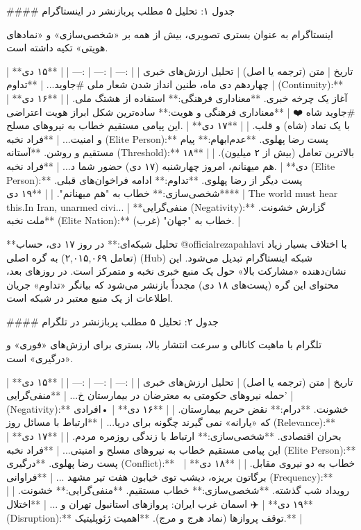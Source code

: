 \documentclass{article}
\begin{document}
#### جدول ۱: تحلیل ۵ مطلب پربازنشر در اینستاگرام

اینستاگرام به عنوان بستری تصویری، بیش از همه بر «شخصی‌سازی» و «نمادهای هویتی» تکیه داشته است.

| تاریخ | متن (ترجمه یا اصل) | تحلیل ارزش‌های خبری |
| :--- | :--- | :--- |
| **۱۵ دی** | چهاردهم دی ماه، طنین انداز شدن شعار ملی #جاوید... | **تداوم (Continuity):** آغاز یک چرخه خبری. **معناداری فرهنگی:** استفاده از هشتگ ملی. |
| **۱۶ دی** | #جاوید شاه ❤️ | **معناداری فرهنگی و هویت:** ساده‌ترین شکل ابراز هویت اعتراضی با یک نماد (شاه) و قلب. |
| **۱۷ دی** | .این پیامی مستقیم خطاب به نیروهای مسلح و امنیت... | **فراد نخبه (Elite Person):** پست رضا پهلوی. **عدم‌ابهام:** پیام مستقیم و روشن. **آستانه (Threshold):** بالاترین تعامل (بیش از ۲ میلیون). |
| **۱۸ دی** | .هم میهنانم، امروز چهارشنبه (۱۷ دی) حضور شما د... | **فراد نخبه (Elite Person):** پست دیگر از رضا پهلوی. **تداوم:** ادامه فراخوان‌های قبلی. **شخصی‌سازی:** خطاب به "هم میهنانم". |
| **۱۹ دی** | The world must hear this.In Iran, unarmed civi... | **منفی‌گرایی (Negativity):** گزارش خشونت. **ملت نخبه (Elite Nation):** خطاب به "جهان" (غرب). |

**تحلیل شبکه‌ای:** در روز ۱۷ دی، حساب @officialrezapahlavi با اختلاف بسیار زیاد (تعامل ۲,۰۱۵,۰۶۹) به گره اصلی (Hub) شبکه اینستاگرام تبدیل می‌شود. این نشان‌دهنده «مشارکت بالا» حول یک منبع خبری نخبه و متمرکز است. در روزهای بعد، محتوای این گره (پست‌های ۱۸ دی) مجدداً بازنشر می‌شود که بیانگر «تداوم» جریان اطلاعات از یک منبع معتبر در شبکه است.

#### جدول ۲: تحلیل ۵ مطلب پربازنشر در تلگرام

تلگرام با ماهیت کانالی و سرعت انتشار بالا، بستری برای ارزش‌های «فوری» و «درگیری» است.

| تاریخ | متن (ترجمه یا اصل) | تحلیل ارزش‌های خبری |
| :--- | :--- | :--- |
| **۱۵ دی** | 'حمله نیروهای حکومتی به معترضان در بیمارستان خ... | **منفی‌گرایی (Negativity):** خشونت. **درام:** نقض حریم بیمارستان. |
| **۱۶ دی** | •️افرادی که «یارانه» نمی گیرند چگونه برای دریا... | **ارتباط با مسائل روز (Relevance):** بحران اقتصادی. **شخصی‌سازی:** ارتباط با زندگی روزمره مردم. |
| **۱۷ دی** | این پیامی مستقیم خطاب به نیروهای مسلح و امنیتی... | **فراد نخبه (Elite Person):** پست رضا پهلوی. **درگیری (Conflict):** خطاب به دو نیروی مقابل. |
| **۱۸ دی** | 🔴 برگاتون بریزه، دیشب توی خیابون هفت تیر مشهد ... | **فراوانی (Frequency):** رویداد شب گذشته. **شخصی‌سازی:** خطاب مستقیم. **منفی‌گرایی:** خشونت. |
| **۱۹ دی** | ✈️ اسمان غرب ایران: پروازهای استانبول تهران و ... | **اختلال (Disruption):** توقف پروازها (نماد هرج و مرج). **اهمیت ژئوپلیتیک.** |
\end{document}
